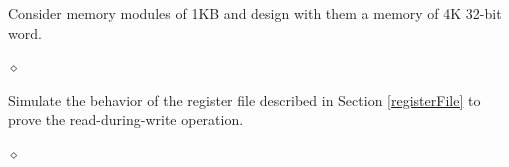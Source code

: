 


\begin{problem}
Consider memory modules of 1KB and design with them a memory of 4K 32-bit word.

$\diamond$
\end{problem}

\begin{problem}
Simulate the behavior of the register file described in Section \ref{registerFile} to prove the read-during-write operation.

$\diamond$
\end{problem} 